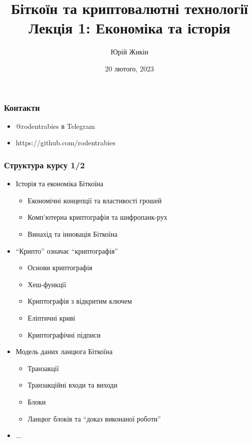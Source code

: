 \documentclass{beamer}
\title{
  Біткоїн та криптовалютні технології \\
  Лекція 1: Економіка та історія
}
\author{Юрій Жикін}
\date{20 лютого, 2023}
\begin{document}
\frame{\titlepage}

\begin{frame}
  \frametitle{Контакти}
  \begin{itemize}
  \item @rodentrabies в Telegram
  \item https://github.com/rodentrabies
  \end{itemize}
\end{frame}

\begin{frame}
  \frametitle{Структура курсу 1/2}
  \begin{itemize}
  \item Історія та економіка Біткоїна
    \begin{itemize}
    \item Економічні концепції та властивості грошей
    \item Комп'ютерна криптографія та шифропанк-рух
    \item Винахід та інновація Біткоїна
    \end{itemize}
  \item ``Крипто'' означає ``криптографія''
    \begin{itemize}
    \item Основи криптографія
    \item Хеш-функції
    \item Криптографія з відкритим ключем
    \item Еліптичні криві
    \item Криптографічні підписи
    \end{itemize}
  \item Модель даних ланцюга Біткоїна
    \begin{itemize}
    \item Транзакції
    \item Транзакційні входи та виходи
    \item Блоки
    \item Ланцюг блоків та ``доказ виконаної роботи''
    \end{itemize}
  \item[] ...
  \end{itemize}
\end{frame}
\end{document}
